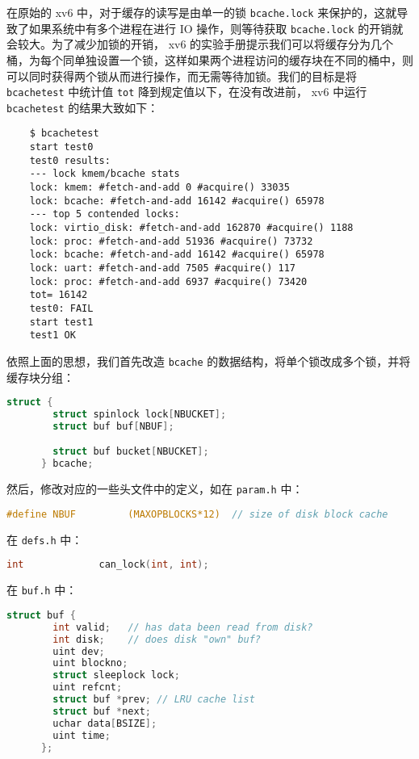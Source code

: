 在原始的 xv6 中，对于缓存的读写是由单一的锁 \lstinline{bcache.lock} 来保护的，这就导致了如果系统中有多个进程在进行 IO 操作，则等待获取 \lstinline{bcache.lock} 的开销就会较大。为了减少加锁的开销， xv6 的实验手册提示我们可以将缓存分为几个桶，为每个同单独设置一个锁，这样如果两个进程访问的缓存块在不同的桶中，则可以同时获得两个锁从而进行操作，而无需等待加锁。我们的目标是将 \lstinline{bcachetest} 中统计值 \lstinline{tot} 降到规定值以下，在没有改进前， xv6 中运行 \lstinline{bcachetest} 的结果大致如下：
\begin{lstlisting}
    $ bcachetest
    start test0
    test0 results:
    --- lock kmem/bcache stats
    lock: kmem: #fetch-and-add 0 #acquire() 33035
    lock: bcache: #fetch-and-add 16142 #acquire() 65978
    --- top 5 contended locks:
    lock: virtio_disk: #fetch-and-add 162870 #acquire() 1188
    lock: proc: #fetch-and-add 51936 #acquire() 73732
    lock: bcache: #fetch-and-add 16142 #acquire() 65978
    lock: uart: #fetch-and-add 7505 #acquire() 117
    lock: proc: #fetch-and-add 6937 #acquire() 73420
    tot= 16142
    test0: FAIL
    start test1
    test1 OK
\end{lstlisting}


依照上面的思想，我们首先改造 \lstinline{bcache} 的数据结构，将单个锁改成多个锁，并将缓存块分组：
\begin{lstlisting}[language=C]
    struct {
        struct spinlock lock[NBUCKET];
        struct buf buf[NBUF];

        struct buf bucket[NBUCKET];
      } bcache;
\end{lstlisting}

然后，修改对应的一些头文件中的定义，如在 \lstinline{param.h} 中：
\begin{lstlisting}[language=C]
    #define NBUF         (MAXOPBLOCKS*12)  // size of disk block cache
\end{lstlisting}
在 \lstinline{defs.h} 中：
\begin{lstlisting}[language=C]
    int             can_lock(int, int);
\end{lstlisting}

在 \lstinline{buf.h} 中：
\begin{lstlisting}[language=C]
    struct buf {
        int valid;   // has data been read from disk?
        int disk;    // does disk "own" buf?
        uint dev;
        uint blockno;
        struct sleeplock lock;
        uint refcnt;
        struct buf *prev; // LRU cache list
        struct buf *next;
        uchar data[BSIZE];
        uint time;
      };
\end{lstlisting}

